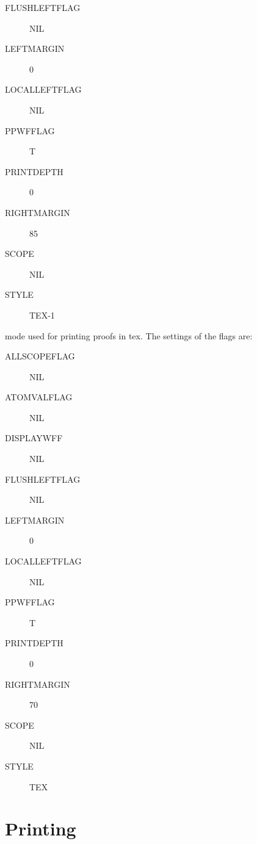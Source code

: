 \begin{description}
\begin{description}
\item[FLUSHLEFTFLAG] NIL

\item[LEFTMARGIN] 0

\item[LOCALLEFTFLAG] NIL

\item[PPWFFLAG] T

\item[PRINTDEPTH] 0

\item[RIGHTMARGIN] 85

\item[SCOPE] NIL

\item[STYLE] TEX-1

\end{description}

\item[TEX-OTL]  
mode used for printing proofs in tex. The settings of the flags are:
\begin{description}
\item[ALLSCOPEFLAG] NIL

\item[ATOMVALFLAG] NIL

\item[DISPLAYWFF] NIL

\item[FLUSHLEFTFLAG] NIL

\item[LEFTMARGIN] 0

\item[LOCALLEFTFLAG] NIL

\item[PPWFFLAG] T

\item[PRINTDEPTH] 0

\item[RIGHTMARGIN] 70

\item[SCOPE] NIL

\item[STYLE] TEX

\end{description}

\item
\end{description}

\section{Printing}

